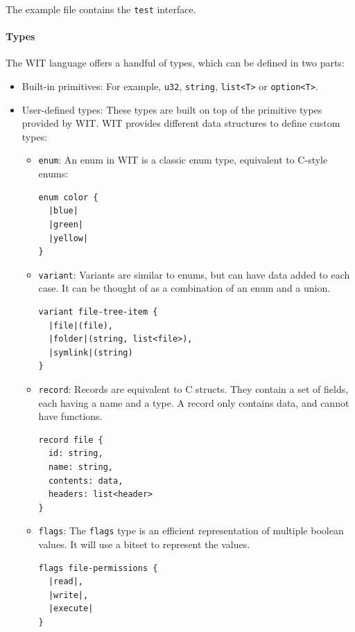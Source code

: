 The example file contains the \texttt{test} interface.

\paragraph{Types}
The WIT language offers a handful of types, which can be defined in two parts:
\begin{itemize}
\item Built-in primitives: For example, \texttt{u32}, \texttt{string}, \texttt{list<T>} or \texttt{option<T>}.
\item User-defined types: These types are built on top of the primitive types provided by WIT. WIT provides different data structures to define custom types:
\begin{itemize}
\item \texttt{enum}: An enum in WIT is a classic enum type, equivalent to C-style enums:
\begin{lstlisting}[language=wit]
enum color {
  |blue|
  |green|
  |yellow|
}
\end{lstlisting}

\item \texttt{variant}: Variants are similar to enums, but can have data added to each case. It can be thought of as a combination of an enum and a union.
\begin{lstlisting}[language=wit]
variant file-tree-item {
  |file|(file),
  |folder|(string, list<file>),
  |symlink|(string)
}
\end{lstlisting}

\item \texttt{record}: Records are equivalent to C structs. They contain a set of fields, each having a name and a type. A record only contains data, and cannot have functions.
\begin{lstlisting}[language=wit]
record file {
  id: string,
  name: string,
  contents: data,
  headers: list<header>
}
\end{lstlisting}

\item \texttt{flags}: The \texttt{flags} type is an efficient representation of multiple boolean values. It will use a bitset to represent the values.

\begin{lstlisting}[language=wit]
flags file-permissions {
  |read|,
  |write|,
  |execute|
}
\end{lstlisting}

\end{itemize}
\end{itemize}


